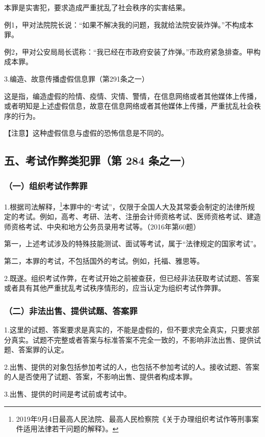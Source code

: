 本罪是实害犯，要求造成严重扰乱了社会秩序的实害结果。

例1，甲对法院院长说：“如果不解决我的问题，我就给法院安装炸弹。”不构成本罪。

例2，甲对公安局局长谎称：“我已经在市政府安装了炸弹。”市政府紧急排查。甲构成本罪。

3.编造、故意传播虚假信息罪（第291条之一）

这是指，编造虚假的险情、疫情、灾情、警情，在信息网络或者其他媒体上传播，或者明知是上述虚假信息，故意在信息网络或者其他媒体上传播，严重扰乱社会秩序的行为。

【注意】这种虚假信息与虚假的恐怖信息是不同的。

\subsection*{五、考试作弊类犯罪（第 284 条之一)}

\subsubsection*{（一）组织考试作弊罪}

1.根据司法解释，\footnote{2019年9月4日最高人民法院、最高人民检察院《关于办理组织考试作等刑事案件适用法律若干问题的解释》。}本罪中的“考试”，仅限于全国人大及其常委会制定的法律所规定的考试。例如，高考、考研、法考、注册会计师资格考试、医师资格考试、建造师资格考试、中央和地方公务员录用考试等。（2016年第60题）

第一，上述考试涉及的特殊技能测试、面试等考试，属于“法律规定的国家考试”。

第二，本罪的考试，不包括国外的考试。例如，托福、雅思等。

2.既遂。组织考试作弊，在考试开始之前被查获，但已经非法获取考试试题、答案或者具有其他严重扰乱考试秩序情形的，应当认定为组织考试作弊罪。

\subsubsection*{（二）非法出售、提供试题、答案罪}

1.这里的试题、答案要求是真实的，不能是虚假的，但不要求完全真实，只要求部分真实。试题不完整或者答案与标准答案不完全一致的，不影响非法出售、提供试题、答案罪的认定。

2.出售、提供的对象包括参加考试的人，也包括不参加考试的人。接收试题、答案的人是否使用了试题、答案，不影响出售、提供者构成本罪。

3.出售、提供的时间是考试前或考试中。

